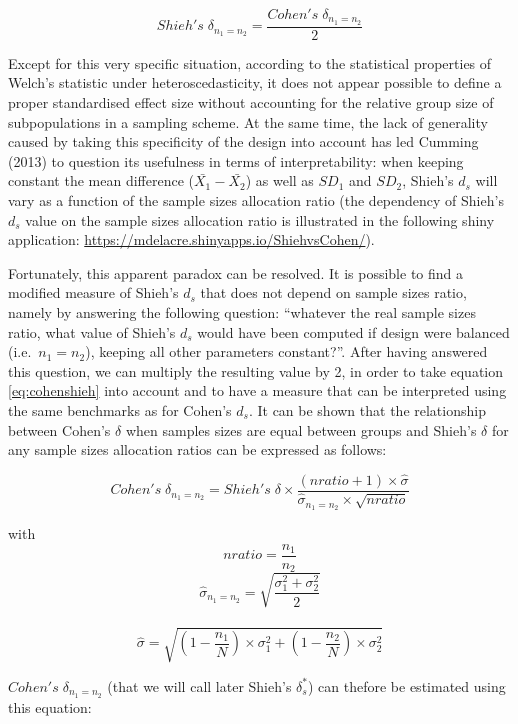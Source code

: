 \documentclass[
  man,floatsintext]{apa6}
\begin{document}
\begin{equation} 
Shieh's \; \delta_{n_1=n_2}= \frac{Cohen's \; \delta_{n_1=n_2}}{2}
\label{eq:cohenshieh}
\end{equation}

Except for this very specific situation, according to the statistical properties of Welch's statistic under heteroscedasticity, it does not appear possible to define a proper standardised effect size without accounting for the relative group size of subpopulations in a sampling scheme. At the same time, the lack of generality caused by taking this specificity of the design into account has led Cumming (2013) to question its usefulness in terms of interpretability: when keeping constant the mean difference (\(\bar{X_1}-\bar{X_2}\)) as well as \(SD_1\) and \(SD_2\), Shieh's \(d_s\) will vary as a function of the sample sizes allocation ratio (the dependency of Shieh's \(d_s\) value on the sample sizes allocation ratio is illustrated in the following shiny application: \url{https://mdelacre.shinyapps.io/ShiehvsCohen/}).

Fortunately, this apparent paradox can be resolved. It is possible to find a modified measure of Shieh's \(d_s\) that does not depend on sample sizes ratio, namely by answering the following question: \enquote{whatever the real sample sizes ratio, what value of Shieh's \(d_s\) would have been computed if design were balanced (i.e.~\(n_1 = n_2\)), keeping all other parameters constant?}. After having answered this question, we can multiply the resulting value by 2, in order to take equation \ref{eq:cohenshieh} into account and to have a measure that can be interpreted using the same benchmarks as for Cohen's \(d_s\). It can be shown that the relationship between Cohen's \(\delta\) when samples sizes are equal between groups and Shieh's \(\delta\) for any sample sizes allocation ratios can be expressed as follows:

\begin{equation} 
Cohen's \; \delta_{n_1=n_2}= Shieh's \; \delta \times \frac{(nratio+1) \times \hat{\sigma}}{\hat{\sigma}_{n_1=n_2} \times \sqrt{nratio}}
\label{eq:shiehvsbaldesignPOP}
\end{equation}

with \[nratio= \frac{n_1}{n_2}\]
\[\hat{\sigma}_{n_1=n_2}= \sqrt{\frac{\sigma_1^2+\sigma_2^2}{2}}\]\\
\[\hat{\sigma} = \sqrt{(1- \frac{n_1}{N}) \times \sigma_1^2+(1- \frac{n_2}{N}) \times \sigma_2^2}\]

\(Cohen's \; \delta_{n_1=n_2}\) (that we will call later Shieh's \(\delta^*_s\)) can thefore be estimated using this equation:
\end{document}
